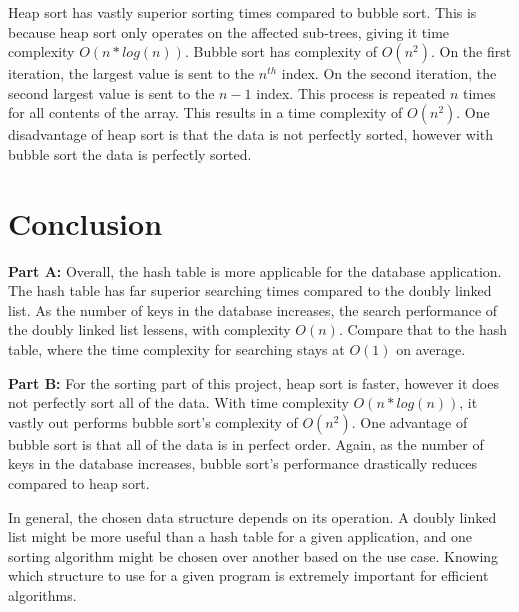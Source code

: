 \documentclass{article}
\begin{document}
Heap sort has vastly superior sorting times compared to bubble sort. This is because heap sort only operates on the affected sub-trees, giving it time complexity \( O(n*log(n))\). Bubble sort has complexity of \( O(n^2) \). On the first iteration, the largest value is sent to the \( n^{th} \) index. On the second iteration, the second largest value is sent to the \( n - 1 \) index. This process is repeated  \( n  \) times for all contents of the array. This results in a time complexity of \( O(n^2) \). One disadvantage of heap sort is that the data is not perfectly sorted, however with bubble sort the data is perfectly sorted. 

\newpage
\section*{Conclusion}

 \textbf{Part A:}
    Overall, the hash table is more applicable for the database application. The hash table has far superior searching times compared to the doubly linked list. As the number of keys in the database increases, the search performance of the doubly linked list lessens, with complexity \( O(n) \). Compare that to the hash table, where the time complexity for searching stays at \( O(1) \) on average.
    
  \textbf{Part B:}
For the sorting part of this project, heap sort is faster, however it does not perfectly sort all of the data. With time complexity \( O(n * log(n)) \), it vastly out performs bubble sort's complexity of \( O(n ^ 2) \). One advantage of bubble sort is that all of the data is in perfect order. Again, as the number of keys in the database increases, bubble sort's performance drastically reduces compared to heap sort. 

In general, the chosen data structure depends on its operation. A doubly linked list might be more useful than a hash table for a given application, and one sorting algorithm might be chosen over another based on the use case. Knowing which structure to use for a given program is extremely important for efficient algorithms. 

 
\end{document}
